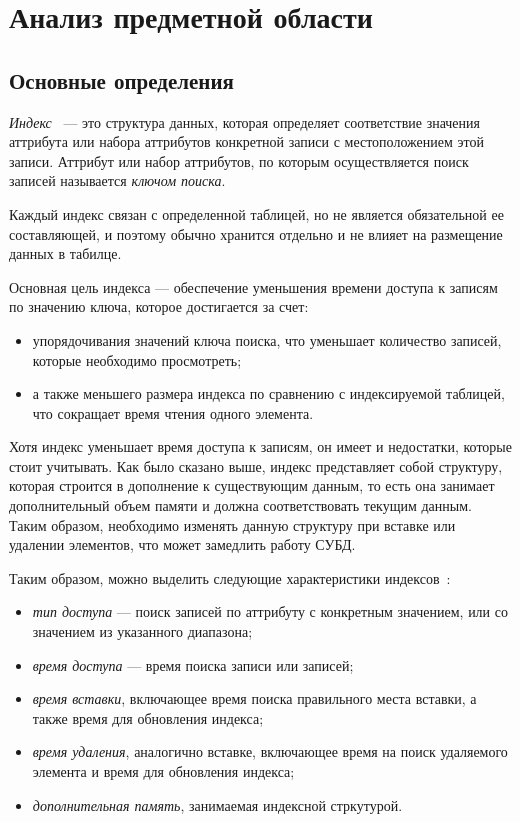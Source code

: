 \chapter{Анализ предметной области}

\section{Основные определения}

\textit{Индекс}~\cite{} --- это структура данных, которая определяет соответствие
значения аттрибута или набора аттрибутов конкретной записи с местоположением
этой записи.  Аттрибут или набор аттрибутов, по которым осуществляется поиск
записей называется \textit{ключом поиска}.

Каждый индекс связан с определенной таблицей, но не является обязательной ее
составляющей, и поэтому обычно хранится отдельно и не влияет на размещение
данных в табилце.

Основная цель индекса --- обеспечение уменьшения времени доступа к записям по
значению ключа, которое достигается за счет:

\begin{itemize}
    \item упорядочивания значений ключа поиска, что уменьшает количество
        записей, которые необходимо просмотреть;
    \item а также меньшего размера индекса по сравнению с индексируемой
        таблицей, что сокращает время чтения одного элемента.
\end{itemize}

Хотя индекс уменьшает время доступа к записям, он имеет и недостатки, которые
стоит учитывать. Как было сказано выше, индекс представляет собой структуру,
которая строится в дополнение к существующим данным, то есть она занимает
дополнительный объем памяти и должна соответствовать текущим данным. Таким
образом, необходимо изменять данную структуру при вставке или удалении
элементов, что может замедлить работу СУБД.

Таким образом, можно выделить следующие характеристики индексов~\cite{ship}:

\begin{itemize}
    \item \textit{тип доступа} --- поиск записей по аттрибуту с конкретным
        значением, или со значением из указанного диапазона;
    \item \textit{время доступа} --- время поиска записи или записей;
    \item \textit{время вставки}, включающее время поиска правильного места вставки, а
        также время для обновления индекса;
    \item \textit{время удаления}, аналогично вставке, включающее время на поиск
        удаляемого элемента и время для обновления индекса;
    \item \textit{дополнительная память}, занимаемая индексной стркутурой.
\end{itemize}

